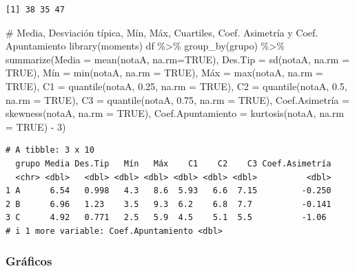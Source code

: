 \documentclass[
  spanish,
  a4paper,
]{scrreport}
\newenvironment{Shaded}{\begin{snugshade}}{\end{snugshade}}
\newcommand{\AttributeTok}[1]{\textcolor[rgb]{0.40,0.45,0.13}{#1}}
\newcommand{\CommentTok}[1]{\textcolor[rgb]{0.37,0.37,0.37}{#1}}
\newcommand{\ConstantTok}[1]{\textcolor[rgb]{0.56,0.35,0.01}{#1}}
\newcommand{\DecValTok}[1]{\textcolor[rgb]{0.68,0.00,0.00}{#1}}
\newcommand{\FloatTok}[1]{\textcolor[rgb]{0.68,0.00,0.00}{#1}}
\newcommand{\FunctionTok}[1]{\textcolor[rgb]{0.28,0.35,0.67}{#1}}
\newcommand{\NormalTok}[1]{\textcolor[rgb]{0.00,0.23,0.31}{#1}}
\newcommand{\OtherTok}[1]{\textcolor[rgb]{0.00,0.23,0.31}{#1}}
\newcommand{\SpecialCharTok}[1]{\textcolor[rgb]{0.37,0.37,0.37}{#1}}
\theoremstyle{definition}
\theoremstyle{definition}
\theoremstyle{remark}
\begin{document}
\begin{verbatim}
[1] 38 35 47
\end{verbatim}

\begin{Shaded}
\begin{Highlighting}[]
\CommentTok{\# Media, Desviación típica, Mín, Máx, Cuartiles, Coef. Asimetría y Coef. Apuntamiento}
\FunctionTok{library}\NormalTok{(moments)}
\NormalTok{df }\SpecialCharTok{\%\textgreater{}\%} \FunctionTok{group\_by}\NormalTok{(grupo) }\SpecialCharTok{\%\textgreater{}\%} \FunctionTok{summarize}\NormalTok{(}\AttributeTok{Media =} \FunctionTok{mean}\NormalTok{(notaA, }\AttributeTok{na.rm=}\ConstantTok{TRUE}\NormalTok{), }\AttributeTok{Des.Tip =} \FunctionTok{sd}\NormalTok{(notaA, }\AttributeTok{na.rm =} \ConstantTok{TRUE}\NormalTok{), Mín }\OtherTok{=} \FunctionTok{min}\NormalTok{(notaA, }\AttributeTok{na.rm =} \ConstantTok{TRUE}\NormalTok{), Máx }\OtherTok{=} \FunctionTok{max}\NormalTok{(notaA, }\AttributeTok{na.rm =} \ConstantTok{TRUE}\NormalTok{), }\AttributeTok{C1 =} \FunctionTok{quantile}\NormalTok{(notaA, }\FloatTok{0.25}\NormalTok{, }\AttributeTok{na.rm =} \ConstantTok{TRUE}\NormalTok{), }\AttributeTok{C2 =} \FunctionTok{quantile}\NormalTok{(notaA, }\FloatTok{0.5}\NormalTok{, }\AttributeTok{na.rm =} \ConstantTok{TRUE}\NormalTok{), }\AttributeTok{C3 =} \FunctionTok{quantile}\NormalTok{(notaA, }\FloatTok{0.75}\NormalTok{, }\AttributeTok{na.rm =} \ConstantTok{TRUE}\NormalTok{), Coef.Asimetría }\OtherTok{=} \FunctionTok{skewness}\NormalTok{(notaA, }\AttributeTok{na.rm =} \ConstantTok{TRUE}\NormalTok{), }\AttributeTok{Coef.Apuntamiento =} \FunctionTok{kurtosis}\NormalTok{(notaA, }\AttributeTok{na.rm =} \ConstantTok{TRUE}\NormalTok{) }\SpecialCharTok{{-}} \DecValTok{3}\NormalTok{)}
\end{Highlighting}
\end{Shaded}

\begin{verbatim}
# A tibble: 3 x 10
  grupo Media Des.Tip   Mín   Máx    C1    C2    C3 Coef.Asimetría
  <chr> <dbl>   <dbl> <dbl> <dbl> <dbl> <dbl> <dbl>          <dbl>
1 A      6.54   0.998   4.3   8.6  5.93   6.6  7.15         -0.250
2 B      6.96   1.23    3.5   9.3  6.2    6.8  7.7          -0.141
3 C      4.92   0.771   2.5   5.9  4.5    5.1  5.5          -1.06 
# i 1 more variable: Coef.Apuntamiento <dbl>
\end{verbatim}

\subsubsection{Gráficos}\label{gruxe1ficos-4}
\end{document}
